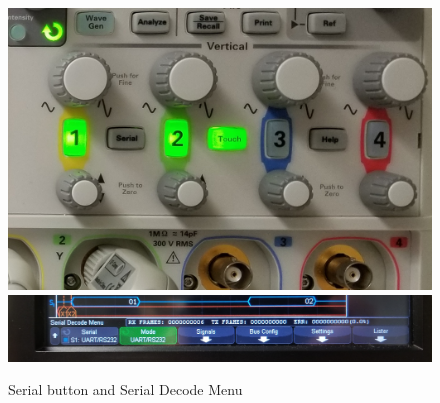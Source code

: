 \documentclass{article}
\begin{document}
  \begin{figure}[h]
    \includegraphics[width=50ex]{serial_button_scope}
    \includegraphics[width=\textwidth]{serial_decode_scope}
    \caption{Serial button and Serial Decode Menu}
  \end{figure}
\end{document}

